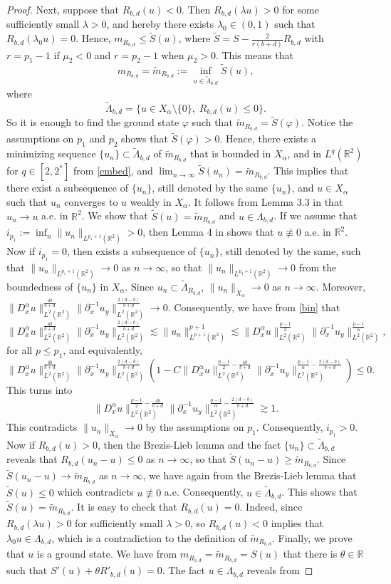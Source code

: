 \documentclass[10pt]{article}
\numberwithin{equation}{section}
\newcommand{\lt}{{L^2(\mathbb{R}^2)}}
\newcommand{\ff}{\varphi}
\newcommand{\lam}{\lambda}
\newcommand{\x}{{X_\alpha}}
\newcommand{\nd}{{\partial_x^{-1}}}
\newcommand{\dx}{D_x^{\alpha}}
\newcommand{\al}{\alpha}
\newcommand{\rr}{\mathbb{R}}
\newcommand{\rt}{{\mathbb{R}^2}}
\newcommand{\rrr}{{R_{b,d}}}
\begin{document}
\begin{proof}
		Next, suppose that $\rrr(u)<0$. Then $\rrr(\lam u)>0$ for some sufficiently small $\lam>0$, and hereby there exists $\lam_0\in(0,1)$ such that $\rrr(\lam_0u)=0$. Hence, $m_\rrr\leq\tilde S(u)$, where  $\tilde S=S-\frac{2}{r(b+d)}\rrr$  with $r=p_1-1$ if $\mu_2<0$ and $r=p_2-1$ when $\mu_2>0$. This means that
		\[
		m_\rrr=\tilde m_\rrr:=\inf_{u\in\tilde\Lambda_{b,d}}\tilde S(u),
		\]
		where \[
		\tilde\Lambda_{b,d}=\{u\in\x\setminus\{0\},\;\rrr(u)\leq0\} .
		\]
		So it is enough to find the ground state $\ff$ such that $\tilde m_\rrr=\tilde S(\ff)$. Notice  the assumptions on $p_1$ and $p_2$ shows that $\tilde S(\ff)>0$. Hence, there exists a minimizing sequence $\{u_n\}\subset\tilde \Lambda_{b,d}$ of $\tilde m_\rrr$ that is bounded in $\x$, and in $L^q(\rt)$ for $q\in[2,2^\ast]$ from \eqref{embed},  and $\lim_{n\to\infty}\tilde S(u_n)=\tilde m_\rrr$. This implies that there exist  a subsequence of $\{u_n\}$, still denoted by the same  $\{u_n\}$, and $u\in\x$ such that $u_n$ converges to $u$ weakly in $\x$. It follows from Lemma 3.3 in \cite{dbs-1} that $u_n\to u$ a.e. in $\rt$. We show that $\tilde S(u)=\tilde m_\rrr$ and $u\in\Lambda_{b,d}$. If we assume that $i_{p_1}:=\inf_n\|u_n\|_{L^{p_1+1}(\rt)}>0$, then Lemma 4 in \cite{liuwang} shows that $u\not\equiv0$ a.e. in $\rt$. Now if  $i_{p_1}=0$, then exists a subsequence of $\{u_n\}$, still denoted by the same, such that $\|u_n\|_{L^{p_1+1}(\rt)}\to0$ as $n\to\infty$, so that $\|u_n\|_{L^{p_2+1}(\rt)}\to0$ from the boundedness of $\{u_n\}$ in $\x$. Since ${u_n}\subset\tilde{\Lambda}_\rrr$, $\|u_n\|_{\dot{X}_\al}\to0$ as $n\to\infty$. Moreover, $\|\dx u\|_\lt^{\frac{4b}{b+d}} \|\nd u_y\|_\lt^{\frac{2(d-b)}{b+d}}\to0$. Consequently, we have from \eqref{bin} that
		\[
		\|\dx u\|_\lt^{\frac{4b}{b+d}} \|\nd u_y\|_\lt^{\frac{2(d-b)}{b+d}}\lesssim \|u_n\|_{L^{p+1}(\rt)}^{p+1}
		\lesssim \|\dx u\|_\lt^{\frac{p-1}{2}} \|\nd u_y\|_\lt^{\frac{p-1}{\al}},
		\]
		for all $p\leq p_1$, and equivalently, 
		$$
		\|\dx u\|_\lt^{\frac{4b}{b+d}} \|\nd u_y\|_\lt^{\frac{2(d-b)}{b+d}}\left(1-C\|\dx u\|_\lt^{\frac{p-1}{2}-\frac{4b}{b+d}} \|\nd u_y\|_\lt^{\frac{p-1}{\al}-\frac{2(d-b)}{b+d}}\right)\leq0.
		$$
		This turns into
		$$
		\|\dx u\|_\lt^{\frac{p-1}{2}-\frac{4b}{b+d}} \|\nd u_y\|_\lt^{\frac{p-1}{\al}-\frac{2(d-b)}{b+d}}\gtrsim 1.
		$$
		This contradicts $\|u_n\|_{\dot{X}_\al}\to0$ by the assumptions on $p_1$. Consequently, $i_{p_1}>0$. Now if $\rrr(u)>0$, then   the Brezis-Lieb lemma  and the fact $\{u_n\}\subset\tilde{\Lambda}_{b,d}$ reveals that $\rrr(u_n-u)\leq0$ as $n\to\infty$, so that $\tilde{S}(u_n-u)\geq \tilde m_\rrr$. Since $\tilde{S}(u_n-u)\to \tilde m_\rrr$ as $n\to\infty$, we have again from the Brezis-Lieb lemma that $\tilde{S}(u)\leq0$ which contradicts $u\not\equiv0$ a.e. Consequently, $u\in\tilde{\Lambda}_{b,d}$. This shows that $\tilde S(u)=\tilde m_\rrr$. It is easy to check that $\rrr(u)=0$. Indeed, since $\rrr(\lam u)>0$ for sufficiently small $\lam>0$, so   $\rrr(u)<0$ implies that $\lam_0u\in\Lambda_{b,d}$, which is a contradiction to the definition of $\tilde m_\rrr$. Finally, we prove that $u$ is a ground state. We have from $m_\rrr=\tilde m_\rrr= S(u)$ that there is $\theta\in\rr$ such that $S'(u)+\theta R'_{b,d}(u)=0$. The fact $u\in\Lambda_{b,d}$ reveals from 

\end{proof}
\end{document}
